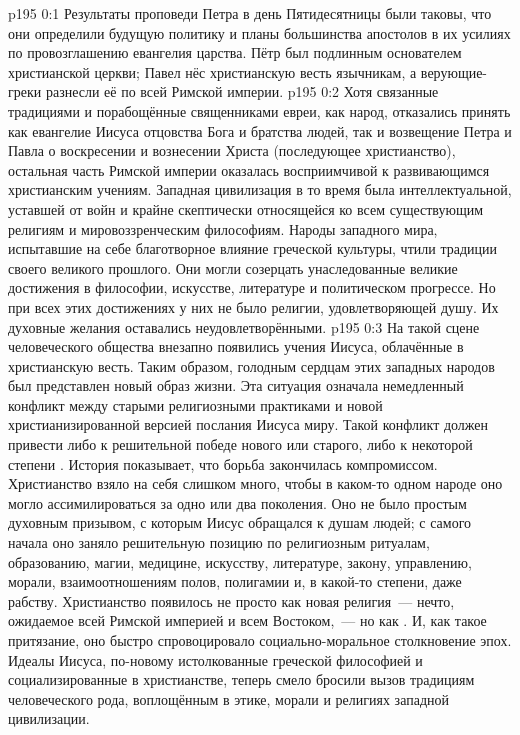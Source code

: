 \author{Промежуточные создания}
\vs p195 0:1 Результаты проповеди Петра в день Пятидесятницы были таковы, что они определили будущую политику и планы большинства апостолов в их усилиях по провозглашению евангелия царства. Пётр был подлинным основателем христианской церкви; Павел нёс христианскую весть язычникам, а верующие\hyp{}греки разнесли её по всей Римской империи.
\vs p195 0:2 Хотя связанные традициями и порабощённые священниками евреи, как народ, отказались принять как евангелие Иисуса отцовства Бога и братства людей, так и возвещение Петра и Павла о воскресении и вознесении Христа (последующее христианство), остальная часть Римской империи оказалась восприимчивой к развивающимся христианским учениям. Западная цивилизация в то время была интеллектуальной, уставшей от войн и крайне скептически относящейся ко всем существующим религиям и мировоззренческим философиям. Народы западного мира, испытавшие на себе благотворное влияние греческой культуры, чтили традиции своего великого прошлого. Они могли созерцать унаследованные великие достижения в философии, искусстве, литературе и политическом прогрессе. Но при всех этих достижениях у них не было религии, удовлетворяющей душу. Их духовные желания оставались неудовлетворёнными.
\vs p195 0:3 На такой сцене человеческого общества внезапно появились учения Иисуса, облачённые в христианскую весть. Таким образом, голодным сердцам этих западных народов был представлен новый образ жизни. Эта ситуация означала немедленный конфликт между старыми религиозными практиками и новой христианизированной версией послания Иисуса миру. Такой конфликт должен привести либо к решительной победе нового или старого, либо к некоторой степени . История показывает, что борьба закончилась компромиссом. Христианство взяло на себя слишком много, чтобы в каком\hyp{}то одном народе оно могло ассимилироваться за одно или два поколения. Оно не было простым духовным призывом, с которым Иисус обращался к душам людей; с самого начала оно заняло решительную позицию по религиозным ритуалам, образованию, магии, медицине, искусству, литературе, закону, управлению, морали, взаимоотношениям полов, полигамии и, в какой\hyp{}то степени, даже рабству. Христианство появилось не просто как новая религия~--- нечто, ожидаемое всей Римской империей и всем Востоком,~--- но как . И, как такое притязание, оно быстро спровоцировало социально\hyp{}моральное столкновение эпох. Идеалы Иисуса, по\hyp{}новому истолкованные греческой философией и социализированные в христианстве, теперь смело бросили вызов традициям человеческого рода, воплощённым в этике, морали и религиях западной цивилизации.
